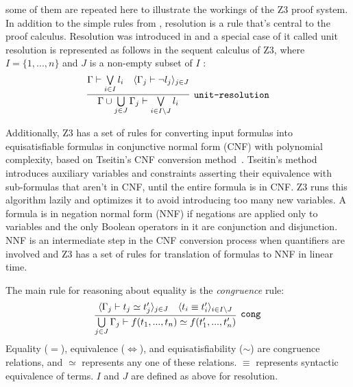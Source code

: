 \documentclass{article}
\begin{document}
		some of them are repeated here to illustrate 
		the workings of the Z3 proof system. In addition
		to the simple rules from ,
		resolution is a rule that's central to the 
		proof calculus. Resolution was introduced in 
		 and a special case of it 
		called unit resolution is represented as follows in 
		the sequent calculus of Z3, where 
		$I = \{1,...,n\}$ and $J$ is a non-empty 
		subset of $I$ :\\
		\begin{equation*}
			\infer[\texttt{unit-resolution}]
				{\Gamma \cup \bigcup\limits_{j \in J}\Gamma_j \vdash \bigvee\limits_{i \in I\setminus J} l_i}
				{\Gamma \vdash \bigvee\limits_{i \in I}l_i & \langle \Gamma_j \vdash \neg l_j \rangle_{j \in J}}
		\end{equation*}
		
		Additionally, Z3 has a set of rules for converting 
		input formulas into equisatisfiable formulas in 
		conjunctive normal form (CNF) with polynomial 
		complexity, based on Tseitin's CNF conversion 
		method~\cite{Tseitin1983}. Tseitin's method 
		introduces auxiliary variables and constraints 
		asserting their equivalence with sub-formulas 
		that aren't in CNF, until the entire formula 
		is in CNF. Z3 runs this algorithm lazily and 
		optimizes it to avoid introducing too many 
		new variables. A formula is in negation normal 
		form (NNF) if negations are applied only to
		variables and the only Boolean operators 
		in it are conjunction and disjunction. 
		NNF is an intermediate step in the CNF 
		conversion process when quantifiers are 
		involved and Z3 has a set of rules for 
		translation of formulas to NNF in linear time.
		
		The main rule for reasoning about equality 
		is the \textit{congruence} rule:
		\begin{equation*}
			\infer[\texttt{cong}]
				{\bigcup\limits_{j\in J}\Gamma_j \vdash f(t_1, ..., t_n) \simeq f(t_1^{\prime},...,t_n^{\prime})}
				{\langle \Gamma_j \vdash t_j \simeq t_j^{\prime} \rangle_{j \in J} & 
				\langle t_i \equiv t_i^{\prime} \rangle_{i \in I\setminus J}}
		\end{equation*}
		Equality ($=$), equivalence ($\iff$), and 
		equisatisfiability ($\sim$) are congruence 
		relations, and $\simeq$ represents any one 
		of these relations. $\equiv$ represents syntactic 
		equivalence of terms. $I$ and $J$ are defined 
		as above for resolution.
		
\end{document}
